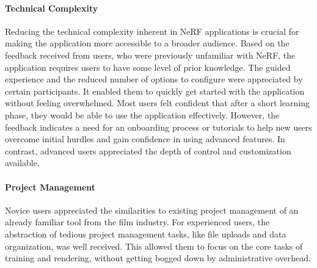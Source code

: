 
\paragraph{Technical Complexity}
Reducing the technical complexity inherent in NeRF applications is crucial for making the application more accessible to a broader audience.
Based on the feedback received from users, who were previously unfamiliar with NeRF, the application requires users to have some level of prior knowledge.
The guided experience and the reduced number of options to configure were appreciated by certain participants.
It enabled them to quickly get started with the application without feeling overwhelmed.
Most users felt confident that after a short learning phase, they would be able to use the application effectively.
\cite{P2, P3, P4, P5, P6, P7, P8}
However, the feedback indicates a need for an onboarding process or tutorials to help new users overcome initial hurdles and gain confidence in using advanced features.
In contrast, advanced users appreciated the depth of control and customization available.
\cite{P9, P10}


\paragraph{Project Management}
Novice users appreciated the similarities to existing project management of an already familiar tool from the film industry. 
\cite{P5}
For experienced users, the abstraction of tedious project management tasks, like file uploads and data organization, was well received.
\cite{P1}
This allowed them to focus on the core tasks of training and rendering, without getting bogged down by administrative overhead.


